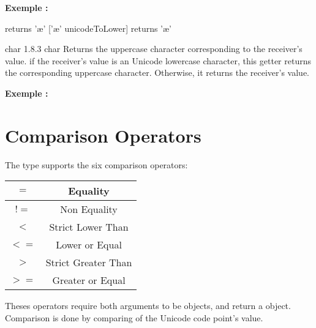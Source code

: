 \textbf{Exemple :}
\begin{galgascode}
['\AE' unicodeToLower] returns '\ae '
['\ae' unicodeToLower] returns '\ae '
\end{galgascode}




{char}
{1.8.3}
{char}
{Returns the uppercase character corresponding to the receiver's value.}
{if the receiver's value is an Unicode lowercase character, this getter returns the corresponding uppercase character. Otherwise, it returns the receiver's value.}

\textbf{Exemple :}
\begin{galgascode}
['\AE' unicodeToUpper] returns '\AE'}
['\ae' unicodeToUpper] returns '\AE'}
\end{galgascode}





\section{Comparison Operators}

The  type supports the six comparison operators:\newline

\begin{tabular}{|c|c|}
\hline
$=$ & Equality \\
\hline
$!=$ & Non Equality \\
\hline
$<$  & Strict Lower Than \\
\hline
$<=$  & Lower or Equal \\
\hline
$>$  & Strict Greater Than \\
\hline
$>=$  & Greater or Equal \\
\hline
\end{tabular}

Theses operators require both arguments to be  objects, and return a  object. Comparison is done by comparing of the Unicode code point's value.


